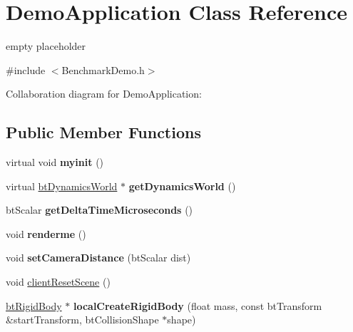 \hypertarget{class_demo_application}{\section{Demo\+Application Class Reference}
\label{class_demo_application}
}


empty placeholder  




{\ttfamily \#include $<$Benchmark\+Demo.\+h$>$}



Collaboration diagram for Demo\+Application\+:
\subsection*{Public Member Functions}
\begin{DoxyCompactItemize}
\item 
\hypertarget{class_demo_application_a86a045de9adf4023a3f2750740229b0f}{virtual void {\bfseries myinit} ()}\label{class_demo_application_a86a045de9adf4023a3f2750740229b0f}

\item 
\hypertarget{class_demo_application_adfa8f19ccdfff098448809ccdf0f443b}{virtual \hyperlink{classbt_dynamics_world}{bt\+Dynamics\+World} $\ast$ {\bfseries get\+Dynamics\+World} ()}\label{class_demo_application_adfa8f19ccdfff098448809ccdf0f443b}

\item 
\hypertarget{class_demo_application_a972635d287f43a7c7cf9fdb0e3d8caf7}{bt\+Scalar {\bfseries get\+Delta\+Time\+Microseconds} ()}\label{class_demo_application_a972635d287f43a7c7cf9fdb0e3d8caf7}

\item 
\hypertarget{class_demo_application_ad3dc9877620b04cfeac65fa65b9ed0c8}{void {\bfseries renderme} ()}\label{class_demo_application_ad3dc9877620b04cfeac65fa65b9ed0c8}

\item 
\hypertarget{class_demo_application_a16fbfc71fb96d19f76e4ba64e289ea73}{void {\bfseries set\+Camera\+Distance} (bt\+Scalar dist)}\label{class_demo_application_a16fbfc71fb96d19f76e4ba64e289ea73}

\item 
void \hyperlink{class_demo_application_a1e7d53bd10abf7c5c0e46f44d05e1aa9}{client\+Reset\+Scene} ()
\item 
\hypertarget{class_demo_application_a64aaf229b2f9a2047b7b718733f02aba}{\hyperlink{classbt_rigid_body}{bt\+Rigid\+Body} $\ast$ {\bfseries local\+Create\+Rigid\+Body} (float mass, const bt\+Transform \&start\+Transform, bt\+Collision\+Shape $\ast$shape)}\label{class_demo_application_a64aaf229b2f9a2047b7b718733f02aba}


\end{DoxyCompactItemize}
